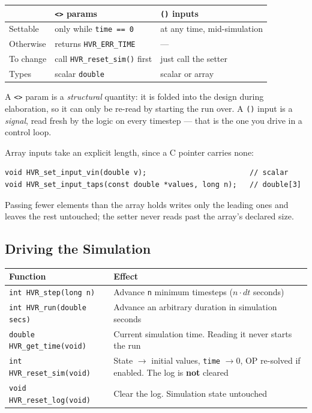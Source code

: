 \documentclass[11pt, a4paper]{article}
\newcommand{\code}[1]{\texttt{\small #1}}
\begin{document}
\begin{center}
\begin{tabular}{@{} L{2.2cm} L{5.4cm} L{5.4cm} @{}}
  \toprule
   & \code{<>} \textbf{params} & \code{()} \textbf{inputs} \\
  \midrule
  Settable & only while \code{time == 0} & at any time, mid-simulation \\
  Otherwise & returns \code{HVR\_ERR\_TIME} & --- \\
  To change & call \code{HVR\_reset\_sim()} first & just call the setter \\
  Types & scalar \code{double} & scalar or array \\
  \bottomrule
\end{tabular}
\end{center}

A \code{<>} param is a \textit{structural} quantity: it is folded into the
design during elaboration, so it can only be re-read by starting the run over.
A \code{()} input is a \textit{signal}, read fresh by the logic on every
timestep --- that is the one you drive in a control loop.

Array inputs take an explicit length, since a C pointer carries none:

\begin{lstlisting}
void HVR_set_input_vin(double v);                        // scalar
void HVR_set_input_taps(const double *values, long n);   // double[3]
\end{lstlisting}

Passing fewer elements than the array holds writes only the leading ones and
leaves the rest untouched; the setter never reads past the array's declared
size.

\subsection{Driving the Simulation}

\begin{center}
\begin{tabular}{@{} L{5.6cm} L{7.4cm} @{}}
  \toprule
  \textbf{Function} & \textbf{Effect} \\
  \midrule
  \code{int HVR\_step(long n)}       & Advance \code{n} minimum timesteps (\(n \cdot dt\) seconds) \\
  \code{int HVR\_run(double secs)}   & Advance an arbitrary duration in simulation seconds \\
  \code{double HVR\_get\_time(void)} & Current simulation time. Reading it never starts the run \\
  \code{int HVR\_reset\_sim(void)}   & State \(\to\) initial values, \code{time} \(\to 0\), OP re-solved if enabled. The log is \textbf{not} cleared \\
  \code{void HVR\_reset\_log(void)}  & Clear the log. Simulation state untouched \\
  \bottomrule
\end{tabular}
\end{center}
\end{document}
